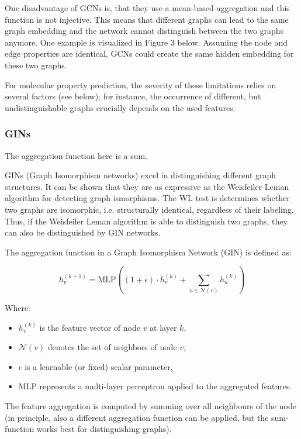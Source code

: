 One disadvantage of GCNs is, that they use a mean-based aggregation and this function is not injective. This means that different graphs can lead to the same graph embedding and the network cannot distinguish between the two graphs anymore. One example is visualized in Figure 3 below. Assuming the node and edge properties are identical, GCNs could create the same hidden embedding for these two graphs.

For molecular property prediction, the severity of these limitations relies on several factors (see below); for instance, the occurrence of different, but undistinguishable graphs crucially depends on the used features.

\subsubsection{GINs}

The aggregation function here is a sum.

\cite{Xu.01.10.2018}
GINs (Graph Isomorphism networks) excel in distinguishing different graph structures. It can be shown that they are as expressive as the Weisfeiler Leman algorithm for detecting graph ismorphisms. 
The WL test is determines whether two graphs are isomorphic, i.e. structurally identical, regardless of their labeling.
Thus, if the Weisfeiler Leman algorithm is able to distinguish two graphs, they can also be distinguished by GIN networks. \cite{}


The aggregation function in a Graph Isomorphism Network (GIN) is defined as:

\[
h_v^{(k+1)} = \text{MLP} \left( (1 + \epsilon) \cdot h_v^{(k)} + \sum_{u \in \mathcal{N}(v)} h_u^{(k)} \right)
\]

Where:
\begin{itemize}
    \item \( h_v^{(k)} \) is the feature vector of node \( v \) at layer \( k \),
    \item \( \mathcal{N}(v) \) denotes the set of neighbors of node \( v \),
    \item \( \epsilon \) is a learnable (or fixed) scalar parameter,
    \item \(\text{MLP}\) represents a multi-layer perceptron applied to the aggregated features.
\end{itemize}

The feature aggregation is computed by summing over all neighbours of the node (in principle, also a different aggregation function can be applied, but the sum-function works best for distinguishing graphs).

